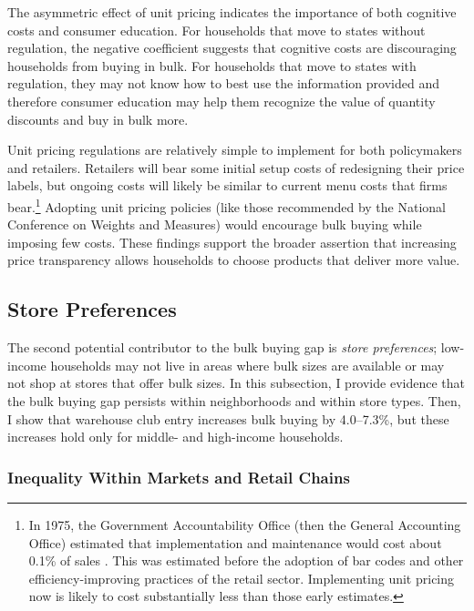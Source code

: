 \documentclass[AER]{AEA_mal}
\begin{document}


The asymmetric effect of unit pricing indicates the importance of both cognitive costs and consumer education. For households that move to states without regulation, the negative coefficient suggests that cognitive costs are discouraging households from buying in bulk. For households that move to states with regulation, they may not know how to best use the information provided and therefore consumer education may help them recognize the value of quantity discounts and buy in bulk more.

Unit pricing regulations are relatively simple to implement for both policymakers and retailers. Retailers will bear some initial setup costs of redesigning their price labels, but ongoing costs will likely be similar to current menu costs that firms bear.\footnote{In 1975, the Government Accountability Office (then the General Accounting Office) estimated that implementation and maintenance would cost about 0.1\% of sales \citep{gao1975}. This was estimated before the adoption of bar codes and other efficiency-improving practices of the retail sector. Implementing unit pricing now is likely to cost substantially less than those early estimates.} Adopting unit pricing policies (like those recommended by the National Conference on Weights and Measures) would encourage bulk buying while imposing few costs. These findings support the broader assertion that increasing price transparency allows households to choose products that deliver more value.

\subsection{Store Preferences}
The second potential contributor to the bulk buying gap is \textit{store preferences}; low-income households may not live in areas where bulk sizes are available or may not shop at stores that offer bulk sizes. In this subsection, I provide evidence that the bulk buying gap persists within neighborhoods and within store types. Then, I show that warehouse club entry increases bulk buying by 4.0--7.3\%, but these increases hold only for middle- and high-income households.

\subsubsection{Inequality Within Markets and Retail Chains}
\end{document}
